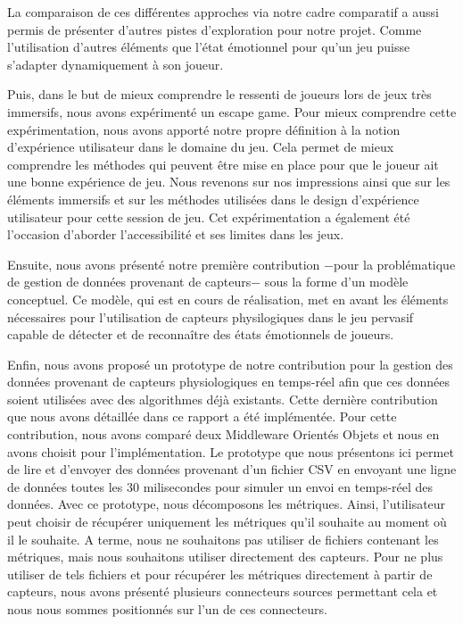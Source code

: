\documentclass[11pt]{article}
\begin{document}
	La comparaison de ces différentes approches via notre cadre comparatif a aussi permis de présenter d'autres pistes d'exploration pour notre projet. 
	Comme l'utilisation d'autres éléments que l'état émotionnel pour qu'un jeu puisse s'adapter dynamiquement à son joueur.\par
	Puis, dans le but de mieux comprendre le ressenti de joueurs lors de jeux très immersifs, nous avons expérimenté un escape game. 
	Pour mieux comprendre cette expérimentation, nous avons apporté notre propre définition à la notion d'expérience utilisateur dans le domaine du jeu. 
	Cela permet de mieux comprendre les méthodes qui peuvent être mise en place pour que le joueur ait une bonne expérience de jeu. 
	Nous revenons sur nos impressions ainsi que sur les éléments immersifs et sur les méthodes utilisées dans le design d'expérience utilisateur pour cette session de jeu. 
	Cet expérimentation a également été l'occasion d'aborder l'accessibilité et ses limites dans les jeux.\par
	Ensuite, nous avons présenté notre première contribution $-$pour la problématique de gestion de données provenant de capteurs$-$ sous la forme d'un modèle conceptuel.
	Ce modèle, qui est en cours de réalisation, met en avant les éléments nécessaires pour l'utilisation de capteurs physilogiques dans le jeu pervasif capable de détecter et de reconnaître des états émotionnels de joueurs.\par
	Enfin, nous avons proposé un prototype de notre contribution pour la gestion des données provenant de capteurs physiologiques en temps-réel afin que ces données soient utilisées avec des algorithmes déjà existants.
	Cette dernière contribution que nous avons détaillée dans ce rapport a été implémentée.
	Pour cette contribution, nous avons comparé deux Middleware Orientés Objets et nous en avons choisit pour l'implémentation.
	Le prototype que nous présentons ici permet de lire et d'envoyer des données provenant d'un fichier CSV en envoyant une ligne de données toutes les 30 milisecondes pour simuler un envoi en temps-réel des données. 
	Avec ce prototype, nous décomposons les métriques.
	Ainsi, l'utilisateur peut choisir de récupérer uniquement les métriques qu'il souhaite au moment où il le souhaite.
	A terme, nous ne souhaitons pas utiliser de fichiers contenant les métriques, mais nous souhaitons utiliser directement des capteurs.
	Pour ne plus utiliser de tels fichiers et pour récupérer les métriques directement à partir de capteurs, nous avons présenté plusieurs connecteurs sources permettant cela et nous nous sommes positionnés sur l'un de ces connecteurs.
\end{document}
